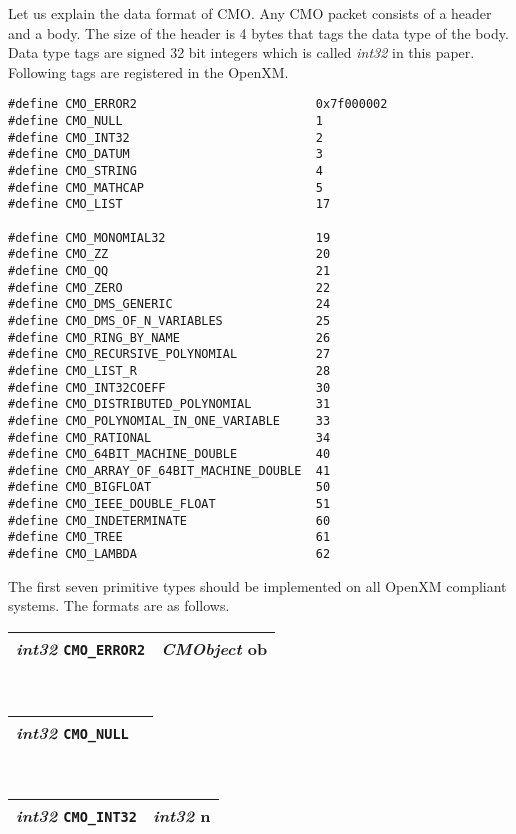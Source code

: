 Let us explain the data format of CMO.
Any CMO packet consists of a header and a body.
The size of the header is 4 bytes that tags the data type of the body.
Data type tags are signed 32 bit integers which is called {\sl int32} in this
paper.
Following tags are registered in the OpenXM.
\begin{verbatim}
#define CMO_ERROR2                         0x7f000002
#define CMO_NULL                           1
#define CMO_INT32                          2
#define CMO_DATUM                          3
#define CMO_STRING                         4
#define CMO_MATHCAP                        5
#define CMO_LIST                           17

#define CMO_MONOMIAL32                     19
#define CMO_ZZ                             20
#define CMO_QQ                             21
#define CMO_ZERO                           22
#define CMO_DMS_GENERIC                    24
#define CMO_DMS_OF_N_VARIABLES             25
#define CMO_RING_BY_NAME                   26
#define CMO_RECURSIVE_POLYNOMIAL           27
#define CMO_LIST_R                         28
#define CMO_INT32COEFF                     30
#define CMO_DISTRIBUTED_POLYNOMIAL         31
#define CMO_POLYNOMIAL_IN_ONE_VARIABLE     33
#define CMO_RATIONAL                       34
#define CMO_64BIT_MACHINE_DOUBLE           40
#define CMO_ARRAY_OF_64BIT_MACHINE_DOUBLE  41
#define CMO_BIGFLOAT                       50
#define CMO_IEEE_DOUBLE_FLOAT              51
#define CMO_INDETERMINATE                  60
#define CMO_TREE                           61
#define CMO_LAMBDA                         62
\end{verbatim}
The first seven primitive types should be implemented 
on all OpenXM compliant systems.
The formats are as follows. \\
\begin{tabular}{|c|c|}
\hline
{\sl int32} {\tt CMO\_ERROR2} & {\sl CMObject} {\rm ob} \\ 
\hline
\end{tabular} \\
\begin{tabular}{|c|c|}
\hline
{\sl int32} {\tt CMO\_NULL}  \\ 
\hline
\end{tabular} \\
\begin{tabular}{|c|c|}
\hline
{\sl int32} {\tt CMO\_INT32}& {\sl int32} {\rm n}  \\ 
\hline
\end{tabular} \\
